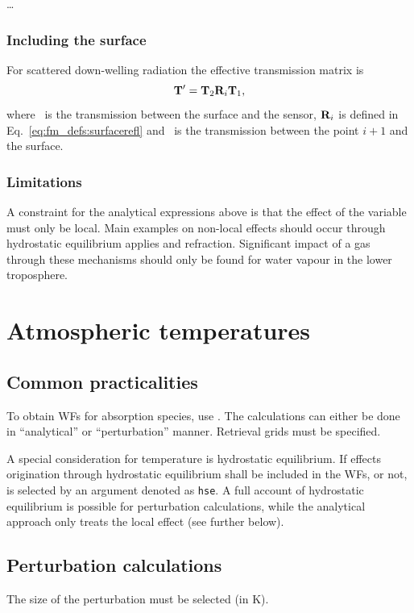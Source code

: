 \dots

\subsubsection{Including the surface}
%
For scattered down-welling radiation the effective transmission
matrix is
\begin{equation}
  \mathbf{T}' = \mathbf{T}_{2}\mathbf{R}_i\mathbf{T}_{1},
\end{equation}
where \ is the transmission between the surface and the sensor,
$\mathbf{R}_i$ is defined in Eq.~\ref{eq:fm_defs:surfacerefl} and
\ is the transmission between the point $i+1$ and the surface.


\subsubsection{Limitations}
%
A constraint for the analytical expressions above is that the effect of the
variable must only be local. Main examples on non-local effects should occur
through hydrostatic equilibrium applies and refraction. Significant impact of a
gas through these mechanisms should only be found for water vapour in the
lower troposphere.





\section{Atmospheric temperatures}
\label{sec:wfuns:atmtemp}

\subsection{Common practicalities}
%
To obtain WFs for absorption species, use .
The calculations can either be done in ``analytical'' or ``perturbation''
manner. Retrieval grids must be specified.

A special consideration for temperature is hydrostatic equilibrium. If effects
origination through hydrostatic equilibrium shall be included in the WFs, or
not, is selected by an argument denoted as \verb|hse|. A full account of
hydrostatic equilibrium is possible for perturbation calculations, while the
analytical approach only treats the local effect (see further below).


\subsection{Perturbation calculations}
%
The size of the perturbation must be selected (in K).

